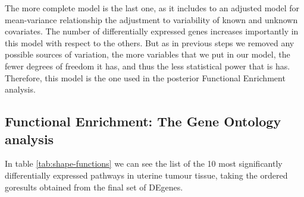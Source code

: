 \documentclass[9pt,twocolumn,twoside]{gsajnl}
\begin{document}
The more complete model is the last one, as it includes to an adjusted model for mean-variance relationship the adjustment to variability of known and unknown covariates. The number of differentially expressed genes increases importantly in this model with respect to the others. But as in previous steps we removed any possible sources of variation, the more variables that we put in our model, the fewer degrees of freedom it has, and thus the less statistical power that is has. Therefore, this model is the one used in the posterior Functional Enrichment analysis.

\subsection{Functional Enrichment: The Gene Ontology analysis}

In table \ref{tab:shape-functions} we can see the list of the 10 most significantly differentially expressed pathways in uterine tumour tissue, taking the ordered goresults obtained from the final set of DEgenes. 
\end{document}
